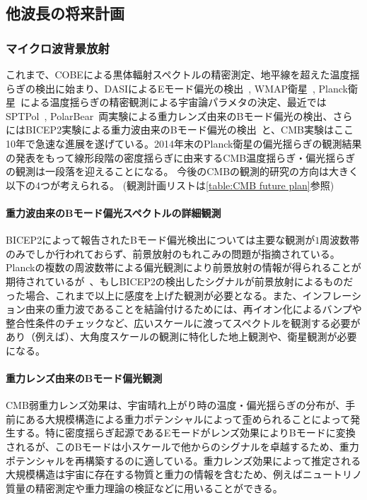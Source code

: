 \subsection{他波長の将来計画}\label{cosmology.s1.ss2}

\subsubsection{マイクロ波背景放射}
これまで、COBEによる黒体輻射スペクトルの精密測定、地平線を超えた温度揺らぎの検出に始まり、DASIによるEモード偏光の検出~\citep{Kovac:2002fg}, WMAP衛星~\citep{Bennett:2012zja}, Planck衛星~\citep{Ade:2013zuv}による温度揺らぎの精密観測による宇宙論パラメタの決定、最近ではSPTPol~\citep{Hanson:2013hsb}, PolarBear~\citep{Ade:2013hjl}両実験による重力レンズ由来のBモード偏光の検出、さらにはBICEP2実験による重力波由来のBモード偏光の検出~\citep{Ade:2014xna}と、CMB実験はここ10年で急速な進展を遂げている。2014年末のPlanck衛星の偏光揺らぎの観測結果の発表をもって線形段階の密度揺らぎに由来するCMB温度揺らぎ・偏光揺らぎの観測は一段落を迎えることになる。%
今後のCMBの観測的研究の方向は大きく以下の4つが考えられる。
(観測計画リストは\ref{table:CMB future plan}参照)


\paragraph{重力波由来のBモード偏光スペクトルの詳細観測}
BICEP2によって報告されたBモード偏光検出については主要な観測が$1$周波数帯のみでしか行われておらず、前景放射のもれこみの問題が指摘されている\citep{Flauger:2014qra,Mortonson:2014bja}。Planckの複数の周波数帯による偏光観測により前景放射の情報が得られることが期待されているが~\citep{Adam:2014bub}、もしBICEP2の検出したシグナルが前景放射によるものだった場合、これまで以上に感度を上げた観測が必要となる。また、インフレーション由来の重力波であることを結論付けるためには、再イオン化によるバンプや整合性条件のチェックなど、広いスケールに渡ってスペクトルを観測する必要があり（例えば\citep{Dodelson:2014exa}）、大角度スケールの観測に特化した地上観測や、衛星観測が必要になる。


\paragraph{重力レンズ由来のBモード偏光観測}
CMB弱重力レンズ効果は、宇宙晴れ上がり時の温度・偏光揺らぎの分布が、手前にある大規模構造による重力ポテンシャルによって歪められることによって発生する。特に密度揺らぎ起源であるEモードがレンズ効果によりBモードに変換されるが、このBモードは小スケールで他からのシグナルを卓越するため、重力ポテンシャルを再構築するのに適している\citep{Okamoto:2003zw,Hirata:2003ka}。重力レンズ効果によって推定される大規模構造は宇宙に存在する物質と重力の情報を含むため、例えばニュートリノ質量の精密測定や重力理論の検証などに用いることができる。


